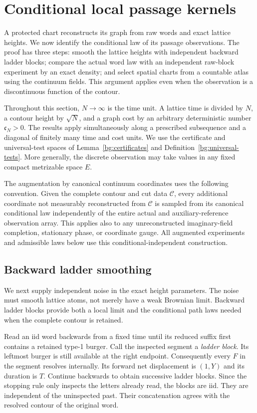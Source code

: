 \section{Conditional local passage kernels}\label{loc:section}\label{sec:local-kernels}

A protected chart reconstructs its graph from raw words and exact lattice
heights. We now identify the conditional law of its passage observations.
The proof has three steps: smooth the lattice heights with independent
backward ladder blocks; compare the actual word law with an independent
raw-block experiment by an exact density; and select spatial charts from
a countable atlas using the continuum fields. This argument applies even
when the observation is a discontinuous function of the contour.

Throughout this section, $N\to\infty$ is the time unit.  A lattice time
is divided by $N$, a contour height by $\sqrt N$, and a graph cost by an
arbitrary deterministic number $\mathfrak c_N>0$.  The results apply simultaneously
along a prescribed subsequence and a diagonal of finitely many time and
cost units.  We use the certificate and universal-test spaces of
Lemma~\ref{bg:certificates} and Definition~\ref{bg:universal-tests}.  More
generally, the discrete observation may take values in any fixed compact
metrizable space $E$.

The augmentation by canonical continuum coordinates uses the following
convention.  Given the complete contour and cut data $\mathcal C$, every
additional coordinate not measurably reconstructed from $\mathcal C$
is sampled from its canonical conditional law independently of the
entire actual and auxiliary-reference observation array.  This applies
also to any unreconstructed imaginary-field completion, stationary
phase, or coordinate gauge.  All augmented experiments and admissible
laws below use this conditional-independent construction.

\subsection{Backward ladder smoothing}

We next supply independent noise in the exact height parameters. The
noise must smooth lattice atoms, not merely have a weak Brownian limit.
Backward ladder blocks provide both a local limit and the conditional
path laws needed when the complete contour is retained.

Read an iid word backwards from a fixed time until its reduced suffix
first contains a retained type-1 burger.  Call the inspected segment a
\emph{ladder block}.  Its leftmost burger is still available at the right
endpoint.  Consequently every $F$ in the segment resolves internally.
Its forward net displacement is $(1,Y)$ and its duration is $T$.  Continue
backwards to obtain successive ladder blocks.  Since the stopping rule
only inspects the letters already read, the blocks are iid.  They are
independent of the uninspected past.  Their concatenation agrees with the
resolved contour of the original word.

